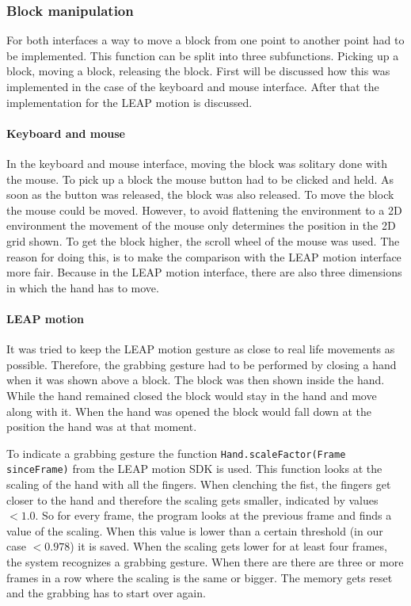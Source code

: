 \subsubsection{Block manipulation}
For both interfaces a way to move a block from one point to another point had to be implemented. This function can be split into three subfunctions. Picking up a block, moving a block, releasing the block. First will be discussed how this was implemented in the case of the keyboard and mouse interface. After that the implementation for the LEAP motion is discussed.

\paragraph{Keyboard and mouse}
In the keyboard and mouse interface, moving the block was solitary done with the mouse. To pick up a block the mouse button had to be clicked and held. As soon as the button was  released, the block was also released. To move the block the mouse could be moved. However, to avoid flattening the environment to a 2D environment the movement of the mouse only determines the position in the 2D grid shown. To get the block higher, the scroll wheel of the mouse was used. The reason for doing this, is to make the comparison with the LEAP motion interface more fair. Because in the LEAP motion interface, there are also three dimensions in which the hand has to move.

\paragraph{LEAP motion}
It was tried to keep the LEAP motion gesture as close to real life movements as possible. Therefore, the grabbing gesture had to be performed by closing a hand when it was shown above a block. The block was then shown inside the hand. While the hand remained closed the block would stay in the hand and move along with it. When the hand was opened the block would fall down at the position the hand was at that moment.

To indicate a grabbing gesture the function \texttt{Hand.scaleFactor(Frame sinceFrame)} from the LEAP motion SDK is used. This function looks at the scaling of the hand with all the fingers. When clenching the fist, the fingers get closer to the hand and therefore the scaling gets smaller, indicated by values $<1.0$. So for every frame, the program looks at the previous frame and finds a value of the scaling. When this value is lower than a certain threshold (in our case $<0.978$) it is saved. When the scaling gets lower for at least four frames, the system recognizes a grabbing gesture. When there are there are three or more frames in a row where the scaling is the same or bigger. The memory gets reset and the grabbing has to start over again.

